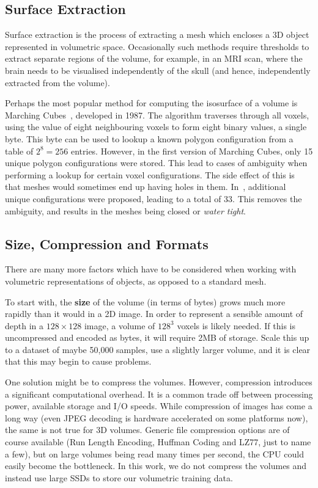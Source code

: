 \subsection{Surface Extraction}

Surface extraction is the process of extracting a mesh which encloses
a 3D object represented in volumetric space. Occasionally such methods
require thresholds to extract separate regions of the volume, for
example, in an MRI scan, where the brain  needs to be visualised
independently of the skull (and hence, independently extracted from
the volume).

Perhaps the most popular method for computing the isosurface of a
volume is Marching Cubes~\cite{lorensen1987marching}, developed in
1987. The algorithm traverses through all voxels, using the value of
eight neighbouring voxels to form eight binary values, a single
byte. This byte can be used to lookup a known polygon configuration
from a table of $2^8 = 256$ entries. However, in the first version of
Marching Cubes, only 15 unique polygon configurations were
stored. This lead to cases of ambiguity when performing a lookup for
certain voxel configurations. The side effect of this is that meshes
would sometimes end up having holes in
them. In~\cite{chernyaev1995marching}, additional unique
configurations were proposed, leading to a total of 33. This removes
the ambiguity, and results in the meshes being closed or \textit{water
  tight}.


\subsection{Size, Compression and Formats}
\label{sec:background:volstorage}

There are many more factors which have to be considered when working
with volumetric representations of objects, as opposed to a standard
mesh.

To start with, the \textbf{size} of the volume (in terms of bytes)
grows much more rapidly than it would in a 2D image. In order to
represent a sensible amount of depth in a $128 \times 128$ image, a
volume of $128^3$ voxels is likely needed. If this is uncompressed and
encoded as bytes, it will require 2MB of storage. Scale this up to a
dataset of maybe 50,000 samples, use a slightly larger volume, and it
is clear that this may begin to cause problems.

One solution might be to compress the volumes. However, compression
introduces a significant computational overhead. It is a common trade
off between processing power, available storage and I/O speeds. While
compression of images has come a long way (even JPEG decoding is
hardware accelerated on some platforms now), the same is not true for
3D volumes. Generic file compression options are of course available
(Run Length Encoding, Huffman Coding and LZ77, just to name a few),
but on large volumes being read many times per second, the CPU could
easily become the bottleneck. In this work, we do not compress the
volumes and instead use large SSDs to store our volumetric training
data.

